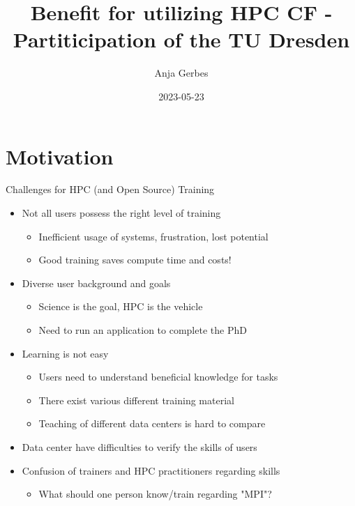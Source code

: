 \documentclass[compress,aspectratio=169]{beamer}
\subtitle{}
\title{\Large Benefit for utilizing HPC CF - Partiticipation of the TU Dresden}
\author{Anja Gerbes}
\date{2023-05-23}
\institute{Technische Universität Dresden, ZIH }
\begin{document}
\begin{frame}[plain]{}
	\maketitle
\end{frame}


\section{Motivation}
\begin{frame}{Challenges for HPC (and Open Source) Training}
		\begin{itemize}
			\item Not all users possess the right level of training
				\begin{itemize}
				\item Inefficient usage of systems, frustration, lost potential
				\item Good training saves compute time and costs!
				\end{itemize}
      \item Diverse user background and goals
        \begin{itemize}
          \item Science is the goal, HPC is the vehicle
          \item Need to run an application to complete the PhD
        \end{itemize}
      \item Learning is not easy
			\begin{itemize}
				\item Users need to understand beneficial knowledge for tasks
				\item There exist various different training material
				\item Teaching of different data centers is hard to compare
			\end{itemize}
			\item Data center have difficulties to verify the skills of users
      \item Confusion of trainers and HPC practitioners regarding skills
        \begin{itemize}
          \item What should one person know/train regarding "MPI"?
        \end{itemize}
		\end{itemize}
\end{frame}
\end{document}
